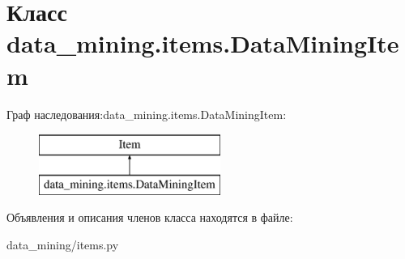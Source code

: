 \hypertarget{classdata__mining_1_1items_1_1DataMiningItem}{}\section{Класс data\+\_\+mining.\+items.\+Data\+Mining\+Item}
\label{classdata__mining_1_1items_1_1DataMiningItem}
Граф наследования\+:data\+\_\+mining.\+items.\+Data\+Mining\+Item\+:\begin{figure}[H]
\begin{center}
\leavevmode
\includegraphics[height=2.000000cm]{classdata__mining_1_1items_1_1DataMiningItem}
\end{center}
\end{figure}


Объявления и описания членов класса находятся в файле\+:\begin{DoxyCompactItemize}
\item 
data\+\_\+mining/items.\+py\end{DoxyCompactItemize}
